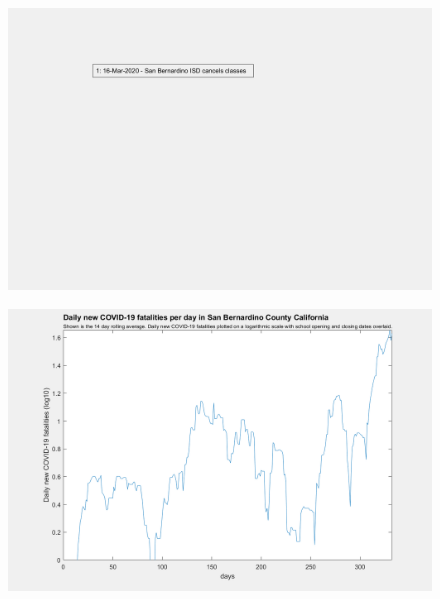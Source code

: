 \documentclass[]{article}
\begin{document}
\begin{figure}[!h]
	\includegraphics[width=\linewidth]{legends/san_bernardino_school_legend.png}
	\caption{}
	\label{fig:legends/san_bernardino_school_legendLabel}
\end{figure}

\begin{figure}[!h]
	\includegraphics[width=\linewidth]{images/san_bernardino_fatalities_school_log.png}
	\caption{}
	\label{fig:images/san_bernardino_fatalities_school_logLabel}
\end{figure}
\end{document}
